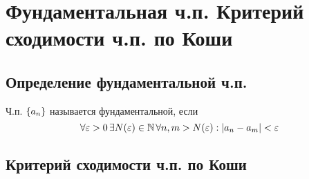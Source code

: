 \chapter{Фундаментальная ч.п. Критерий сходимости ч.п. по Коши}

\section{Определение фундаментальной ч.п.}

{
    Ч.п. $\{ a_n \}$ называется фундаментальной, если
    \[
        \forall \veps > 0 \,
        \exists N(\veps) \in \Nset[] \,
        \forall n, m > N(\veps):
        | a_n - a_m | < \veps
    \]
}

\section{Критерий сходимости ч.п. по Коши}

